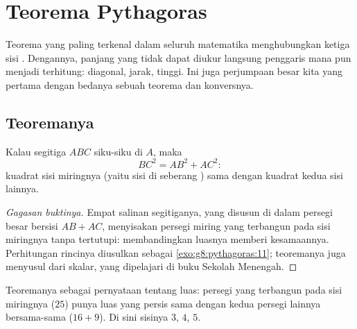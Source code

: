 \chapter{Teorema Pythagoras}\label{ch:g8:pythagoras}

Teorema yang paling terkenal dalam seluruh matematika menghubungkan
ketiga sisi . Dengannya, panjang yang tidak dapat
diukur langsung penggaris mana pun menjadi terhitung: diagonal, jarak,
tinggi. Ini juga perjumpaan besar kita yang pertama dengan bedanya
sebuah teorema dan konversnya.

\section{Teoremanya}

\begin{theorem}[Pythagoras]\label{thm:g8:pythagoras:direct}
Kalau segitiga $ABC$ siku-siku di $A$, maka
\[
BC^2 = AB^2 + AC^2 :
\]
kuadrat sisi miringnya (yaitu sisi di seberang )
sama dengan  kuadrat kedua sisi lainnya.
\end{theorem}

\begin{proof}[Gagasan buktinya]
Empat salinan segitiganya, yang disusun di dalam persegi besar bersisi
$AB + AC$, menyisakan persegi miring yang terbangun pada sisi
miringnya tanpa tertutupi: membandingkan luasnya memberi kesamaannya.
Perhitungan rincinya diusulkan sebagai \cref{exo:g8:pythagoras:11};
teoremanya juga menyusul dari  skalar, yang dipelajari di
buku Sekolah Menengah.
\end{proof}

\begin{omfigure}

{\small Teoremanya sebagai pernyataan tentang luas: persegi yang
terbangun pada sisi miringnya ($25$) punya luas yang persis sama
dengan kedua persegi lainnya bersama-sama ($16 + 9$). Di sini sisinya
$3$, $4$, $5$.}
\end{omfigure}

